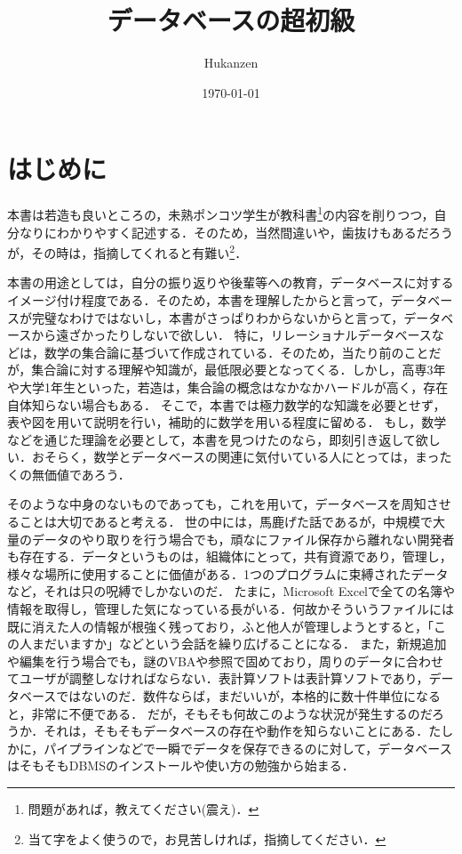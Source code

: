 \documentclass[a4paper,10pt]{jreport}
\title{データベースの超初級}
\author{Hukanzen}
\date{\today}
\begin{document}
\maketitle

\tableofcontents %

\chapter{はじめに}
本書は若造も良いところの，未熟ポンコツ学生が教科書\footnote{問題があれば，教えてください(震え)．}の内容を削りつつ，自分なりにわかりやすく記述する．そのため，当然間違いや，歯抜けもあるだろうが，その時は，指摘してくれると有難い\footnote{当て字をよく使うので，お見苦しければ，指摘してください．}．
\par 本書の用途としては，自分の振り返りや後輩等への教育，データベースに対するイメージ付け程度である．そのため，本書を理解したからと言って，データベースが完璧なわけではないし，本書がさっぱりわからないからと言って，データベースから遠ざかったりしないで欲しい．
特に，リレーショナルデータベースなどは，数学の集合論に基づいて作成されている．そのため，当たり前のことだが，集合論に対する理解や知識が，最低限必要となってくる．しかし，高専3年や大学1年生といった，若造は，集合論の概念はなかなかハードルが高く，存在自体知らない場合もある．
そこで，本書では極力数学的な知識を必要とせず，表や図を用いて説明を行い，補助的に数学を用いる程度に留める．
もし，数学などを通じた理論を必要として，本書を見つけたのなら，即刻引き返して欲しい．おそらく，数学とデータベースの関連に気付いている人にとっては，まったくの無価値であろう．
\par そのような中身のないものであっても，これを用いて，データベースを周知させることは大切であると考える．
世の中には，馬鹿げた話であるが，中規模で大量のデータのやり取りを行う場合でも，頑なにファイル保存から離れない開発者も存在する．データというものは，組織体にとって，共有資源であり，管理し，様々な場所に使用することに価値がある．1つのプログラムに束縛されたデータなど，それは只の呪縛でしかないのだ．
たまに，Microsoft Excelで全ての名簿や情報を取得し，管理した気になっている長がいる．何故かそういうファイルには既に消えた人の情報が根強く残っており，ふと他人が管理しようとすると，「この人まだいますか」などという会話を繰り広げることになる．
また，新規追加や編集を行う場合でも，謎のVBAや参照で固めており，周りのデータに合わせてユーザが調整しなければならない．表計算ソフトは表計算ソフトであり，データベースではないのだ．数件ならば，まだいいが，本格的に数十件単位になると，非常に不便である．
だが，そもそも何故このような状況が発生するのだろうか．それは，そもそもデータベースの存在や動作を知らないことにある．たしかに，パイプラインなどで一瞬でデータを保存できるのに対して，データベースはそもそもDBMSのインストールや使い方の勉強から始まる．
\end{document}
